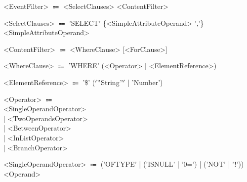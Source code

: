 \documentclass[10pt]{scrreprt}
\begin{document}
\begin{tabbing}
<EventFilter> $\Coloneqq$ <SelectClauses> <ContentFilter>
\end{tabbing}
\begin{tabbing}
<SelectClauses> $\Coloneqq$ 'SELECT' \{<SimpleAttributeOperand> ','\} <SimpleAttributeOperand>
\end{tabbing}
\begin{tabbing}
<ContentFilter> $\Coloneqq$ <WhereClause> [<ForClause>]
\end{tabbing}
\begin{tabbing}
<WhereClause> $\Coloneqq$ 'WHERE' (<Operator> | <ElementReference>)
\end{tabbing}
\begin{tabbing}
<ElementReference> $\Coloneqq$ '\$' (\('"\)String\("'\) | 'Number')
\end{tabbing}
\begin{tabbing}
<Operator> $\Coloneqq$ \\ \hspace{11mm} <SingleOperandOperator> \\ \hspace{10mm} | <TwoOperandsOperator> \\ \hspace{10mm} | <BetweenOperator> \\ \hspace{10mm} | <InListOperator>  \\ \hspace{10mm} | <BranchOperator>
\end{tabbing}
\begin{tabbing}
<SingleOperandOperator> $\Coloneqq$ ('OFTYPE' | ('ISNULL' | '0=') | ('NOT' | '!')) <Operand>
\end{tabbing}
\end{document}
